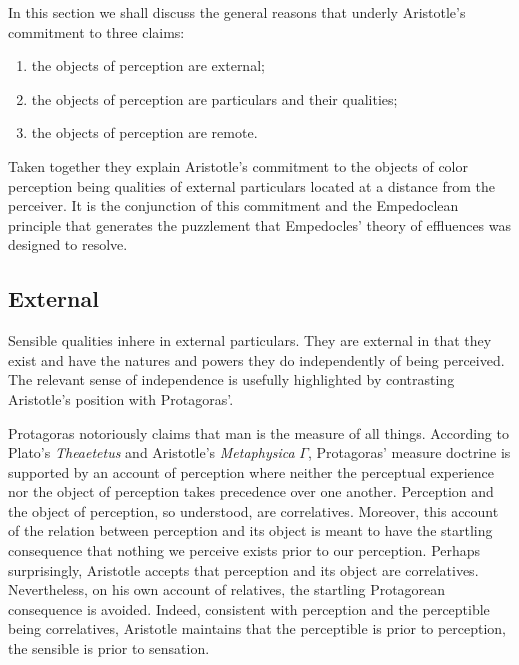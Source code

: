 In this section we shall discuss the general reasons that underly Aristotle's commitment to three claims:
\begin{enumerate}[(1)]
    \item the objects of perception are external;
    \item the objects of perception are particulars and their qualities;
    \item the objects of perception are remote.
\end{enumerate}
Taken together they explain Aristotle's commitment to the objects of color perception being qualities of external particulars located at a distance from the perceiver. It is the conjunction of this commitment and the Empedoclean principle that generates the puzzlement that Empedocles' theory of effluences was designed to resolve.

\subsection{External} %
\label{sub:external}

Sensible qualities inhere in external particulars. They are external in that they exist and have the natures and powers they do independently of being perceived. The relevant sense of independence is usefully highlighted by contrasting Aristotle's position with Protagoras'.

Protagoras notoriously claims that man is the measure of all things. According to Plato's \emph{Theaetetus} and Aristotle's \emph{Metaphysica} \( \Gamma \), Protagoras' measure doctrine is supported by an account of perception where neither the perceptual experience nor the object of perception takes precedence over one another. Perception and the object of perception, so understood, are correlatives. Moreover, this account of the relation between perception and its object is meant to have the startling consequence that nothing we perceive exists prior to our perception. Perhaps surprisingly, Aristotle accepts that perception and its object are correlatives. Nevertheless, on his own account of relatives, the startling Protagorean consequence is avoided. Indeed, consistent with perception and the perceptible being correlatives, Aristotle maintains that the perceptible is prior to perception, the sensible is prior to sensation.

